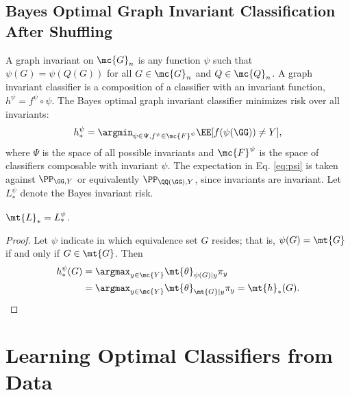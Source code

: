 \documentclass[10pt,journal,cspaper,compsoc]{IEEEtran}
\newcommand{\Qs}{Q}
\begin{document}
\subsection{Bayes Optimal Graph Invariant Classification After Shuffling} %
\label{sec:gi}

A graph invariant on $\mc{G}_n$ is any function $\psi$  such that $\psi(G)=\psi(\Qs(G))$ for all $G \in \mc{G}_n$ and $\Qs \in \mc{Q}_n$.  A graph invariant classifier is a composition of a classifier with an invariant function, $h^\psi=f^\psi \circ \psi$.  The Bayes optimal graph invariant classifier minimizes risk over all invariants: 
\begin{align} \label{eq:psi}
	h_*^{\psi}=\argmin_{\psi \in \Psi, f^{\psi} \in \mc{F}^{\psi}} \EE[f(\psi(\GG))\neq Y],
\end{align}
where $\Psi$ is the space of all possible invariants and $\mc{F}^{\psi}$ is the space of classifiers composable with invariant $\psi$. The expectation in Eq. \eqref{eq:psi} is taken against $\PP_{\GG,Y}$ or equivalently $\PP_{\QQ(\GG),Y}$, since invariants are invariant.
  Let $L_*^{\psi}$ denote the Bayes invariant risk.  
\begin{thm} \label{thm:3}
	$\mt{L}_*=L_*^\psi$.
\end{thm}

\begin{proof}
Let $\psi$ indicate in which equivalence set $G$ resides; that is,  $\psi(G)=\mt{G}$ if and only if $G \in \mt{G}$.  Then
\begin{align}
	h^{\psi}_*(G) &= \argmax_{y \in \mc{Y}} \mt{\theta}_{\psi(G)|y} \pi_y \nonumber \\
	&= \argmax_{y \in \mc{Y}} \mt{\theta}_{\mt{G}|y} \pi_y = \mt{h}_*(G).
\end{align}
\end{proof}



\section{Learning Optimal Classifiers from Data} %
\label{sec:learning_optimal_classifiers_from_data}
\end{document}
